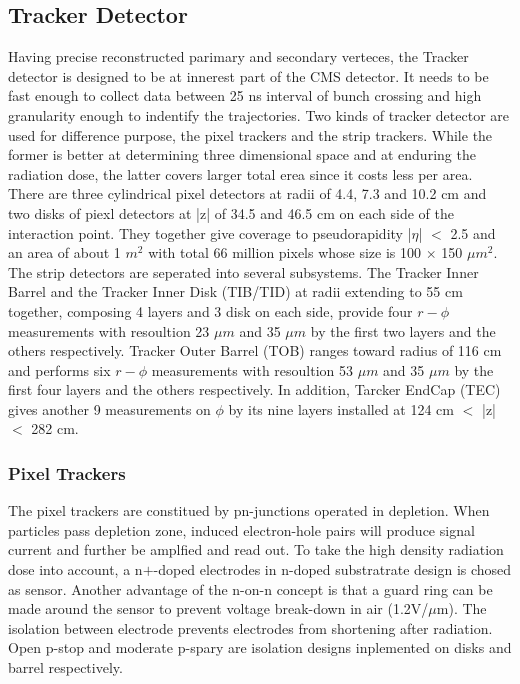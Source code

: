 \subsection{Tracker Detector} 
Having precise reconstructed parimary and secondary verteces, the Tracker detector is designed to be at innerest part of the CMS detector.
It needs to be fast enough to collect data between 25 ns interval of bunch crossing and high granularity enough to indentify the trajectories. 
Two kinds of tracker detector are used for difference purpose, the pixel trackers and the strip trackers. 
While the former is better at determining three dimensional space and at enduring the radiation dose, 
the latter covers larger total erea since it costs less per area. 
There are three cylindrical pixel detectors at radii of 4.4, 7.3 and 10.2 cm and two disks of piexl detectors at |z| of 34.5 and 46.5 cm on each side of the interaction point. 
They together give coverage to pseudorapidity |$\eta $| $<$ 2.5 and an area of about 1 $m^2$ with total 66 million pixels whose size is 100 $\times$ 150 $\mu m^2$. 
The strip detectors are seperated into several subsystems. The Tracker Inner Barrel and the Tracker Inner Disk (TIB/TID) at radii extending to 55 cm together, composing 4 layers and 3 disk on each side, 
provide four $r-\phi $ measurements with resoultion 23 $\mu m$ and 35 $\mu m$ by the first two layers and the others respectively. 
Tracker Outer Barrel (TOB) ranges toward radius of 116 cm and performs six $r-\phi $ measurements with resoultion 53 $\mu m$ and 35 $\mu m$ by the first four layers and the others respectively.
In addition, Tarcker EndCap (TEC) gives another 9 measurements on $\phi $ by its nine layers installed at 124 cm $<$ |z| $<$ 282 cm.
 
\subsubsection{Pixel Trackers}
The pixel trackers are constitued by pn-junctions operated in depletion. 
When particles pass depletion zone, induced electron-hole pairs will produce signal current and further be amplfied and read out. 
To take the high density radiation dose into account, a n$+$-doped electrodes in n-doped substratrate design is chosed as sensor. 
Another advantage of the n-on-n concept is that a guard ring can be made around the sensor to prevent voltage break-down in air (1.2V/$\mu $m). 
The isolation between electrode prevents electrodes from shortening after radiation. Open p-stop and moderate p-spary are isolation designs inplemented on disks and barrel respectively.

